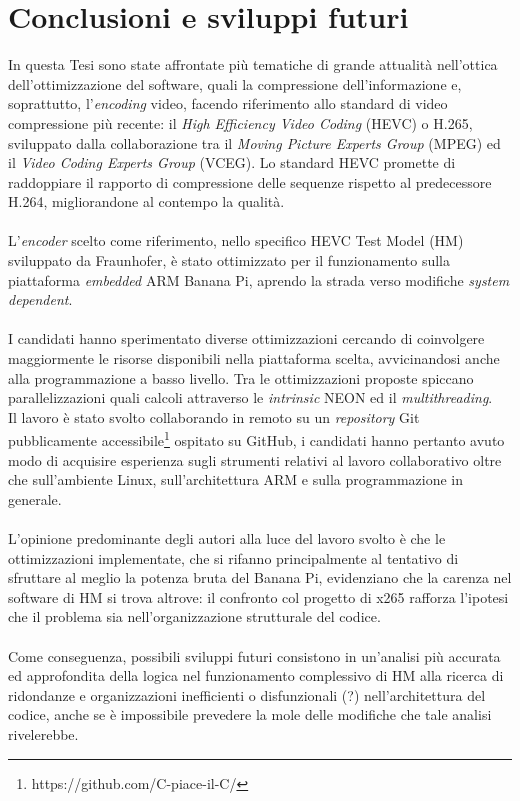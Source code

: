 
\chapter{Conclusioni e sviluppi futuri} %
In questa Tesi sono state affrontate più tematiche di grande attualità  
nell'ottica dell'ottimizzazione del software, quali la compressione 
dell'informazione e, soprattutto, l'\textit{encoding} video, facendo 
riferimento allo standard di video compressione più recente: il \emph{High 
Efficiency Video Coding} (HEVC) o H.265, sviluppato dalla collaborazione tra il 
\emph{Moving Picture Experts Group} (MPEG) ed il \emph{Video Coding Experts 
Group} (VCEG). 
Lo standard HEVC promette di raddoppiare il rapporto di compressione delle 
sequenze rispetto al predecessore H.264, migliorandone al contempo la qualità.
\\ \\
L'\textit{encoder} scelto come riferimento, nello specifico HEVC Test Model 
(HM) sviluppato da Fraunhofer, è stato ottimizzato per il funzionamento sulla 
piattaforma \textit{embedded} ARM Banana Pi, aprendo la strada verso modifiche 
\emph{system dependent}.
\\ \\
I candidati hanno sperimentato diverse ottimizzazioni cercando di coinvolgere 
maggiormente le risorse disponibili nella piattaforma scelta, avvicinandosi 
anche alla programmazione a basso livello. Tra le ottimizzazioni proposte 
spiccano parallelizzazioni quali calcoli attraverso le \textit{intrinsic} NEON 
ed il \textit{multithreading}. \\
Il lavoro è stato svolto collaborando in remoto su un \emph{repository} 
Git pubblicamente accessibile\footnote{https://github.com/C-piace-il-C/} 
ospitato su GitHub, i candidati hanno pertanto avuto modo di acquisire 
esperienza sugli strumenti relativi al lavoro collaborativo oltre che 
sull'ambiente Linux, sull'architettura ARM e sulla programmazione in 
generale.\\ \\
L'opinione predominante degli autori alla luce del lavoro svolto è che le 
ottimizzazioni implementate, che si rifanno principalmente al tentativo di 
sfruttare al meglio la potenza bruta del Banana Pi, evidenziano che la carenza 
nel software di HM si trova altrove: il confronto col progetto di x265 rafforza 
l'ipotesi che il problema sia nell'organizzazione strutturale del codice.
\\ \\
Come conseguenza, possibili sviluppi futuri consistono in un'analisi più 
accurata ed approfondita della logica nel funzionamento complessivo di HM alla 
ricerca di ridondanze e organizzazioni inefficienti o disfunzionali (?) 
nell'architettura del codice, anche se è impossibile prevedere la mole delle 
modifiche che tale analisi rivelerebbe.
\label{Chapter8} %

